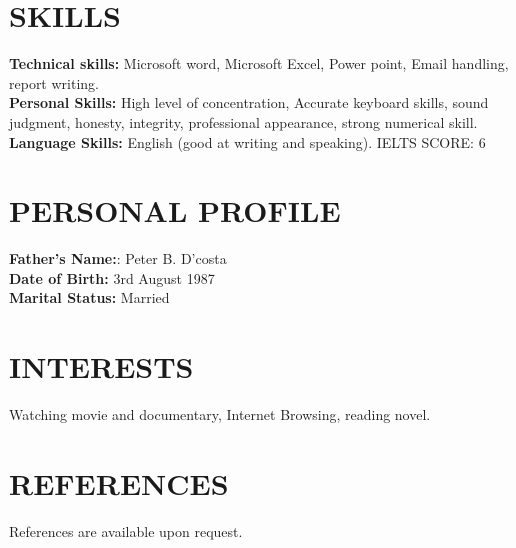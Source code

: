 \documentclass[margin]{res}
\begin{document}
\begin{resume}
\section{SKILLS}

\textbf{Technical skills:} Microsoft word, Microsoft Excel, Power point, Email handling, report writing.
\\
\textbf{Personal Skills:} High level of concentration, Accurate keyboard skills, sound judgment, honesty, integrity, professional appearance, strong numerical skill.
\\
\textbf{Language Skills:} English (good at writing and speaking). IELTS SCORE: 6


\section{PERSONAL PROFILE}
\textbf{Father's Name:}: Peter B. D'costa 
\\
\textbf{Date of Birth:} 3rd August 1987
\\
\textbf{Marital Status:} Married


\section{INTERESTS}
Watching movie and documentary, Internet Browsing, reading novel.


\section{REFERENCES}
References are available upon request.

\end{resume}
\end{document}
